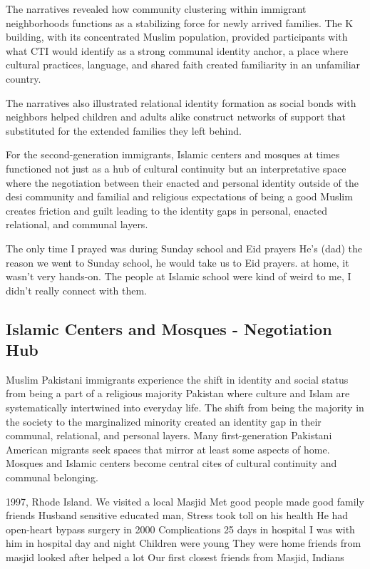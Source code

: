 The narratives revealed how community clustering within immigrant neighborhoods functions as a stabilizing force for newly arrived families. The K building, with its concentrated Muslim population, provided participants with what CTI would identify as a strong communal identity anchor, a place where cultural practices, language, and shared faith created familiarity in an unfamiliar country.

The narratives also illustrated relational identity formation as social bonds with neighbors helped children and adults alike construct networks of support that substituted for the extended families they left behind.

For the second-generation immigrants, Islamic centers and mosques at times functioned not just as a hub of cultural continuity but an interpretative space where the negotiation between their enacted and personal identity outside of the desi community and familial and  religious expectations of being a good Muslim creates friction and guilt leading to the identity gaps in personal, enacted relational, and communal layers. 

\begin{FoundPoem}
The only time I prayed was during Sunday school and Eid prayers 
He’s (dad) the reason we went to Sunday school,  
he would take us to Eid prayers.  
at home, it wasn’t very hands-on. 
The people at Islamic school were kind of weird to me,  
I didn’t really connect with them.
\end{FoundPoem}

\subsection{Islamic Centers and Mosques - Negotiation Hub}

Muslim Pakistani immigrants experience the shift in identity and social status from being a part of a religious majority Pakistan where culture and Islam are systematically intertwined into everyday life. The shift from being the majority in the society to the marginalized minority created an identity gap in their communal, relational, and personal layers. Many first-generation Pakistani American migrants seek spaces that mirror at least some aspects of home. Mosques and Islamic centers become central cites of cultural continuity and communal belonging.

\begin{FoundPoem}
1997, Rhode Island.
We visited a local Masjid
Met good people
made good family friends 
Husband sensitive educated man,
Stress took toll on his health
He had open-heart bypass surgery in 2000
Complications
25 days in hospital
I was with him in hospital day and night
Children were young 
They were home
friends from masjid
looked after
helped a lot
Our first closest friends from Masjid, Indians
\end{FoundPoem}


